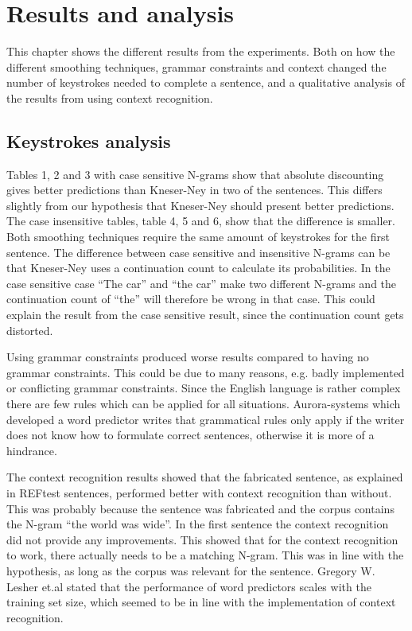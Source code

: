 \section{Results and analysis}
This chapter shows the different results from the experiments. Both on how the different smoothing techniques, grammar constraints and context changed the number of keystrokes needed to complete a sentence, and a qualitative analysis of the results from using context recognition.

\subsection{Keystrokes analysis}
Tables 1, 2 and 3 with case sensitive N-grams show that absolute discounting gives better predictions than Kneser-Ney in two of the sentences. This differs slightly from our hypothesis that Kneser-Ney should present better predictions. The case insensitive tables, table 4, 5 and 6, show that the difference is smaller. Both smoothing techniques require the same amount of keystrokes for the first sentence. The difference between case sensitive and insensitive N-grams can be that Kneser-Ney uses a continuation count to calculate its probabilities. In the case sensitive case “The car” and “the car” make two different N-grams and the continuation count of “the” will therefore be wrong in that case. This could explain the result from the case sensitive result, since the continuation count gets distorted.

Using grammar constraints produced worse results compared to having no grammar constraints. This could be due to many reasons, e.g. badly implemented or conflicting grammar constraints. Since the English language is rather complex there are few rules which can be applied for all situations. Aurora-systems which developed a word predictor writes that grammatical rules only apply if the writer does not know how to formulate correct sentences, otherwise it is more of a hindrance\cite{aurora}.

The context recognition results showed that the fabricated sentence, as explained in REFtest sentences, performed better with context recognition than without. This was probably because the sentence was fabricated and the corpus contains the N-gram “the world was wide”. In the first sentence the context recognition did not provide any improvements. This showed that for the context recognition to work, there actually needs to be a matching N-gram. This was in line with the hypothesis, as long as the corpus was relevant for the sentence. Gregory W. Lesher et.al stated that the performance of word predictors scales with the training set size\cite{Lesher99effectsof}, which seemed to be in line with the implementation of context recognition.
\vspace{1em}

